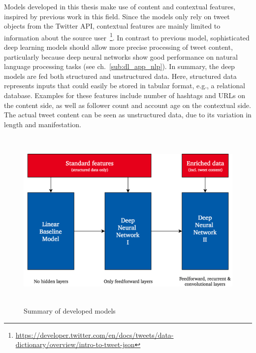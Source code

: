 Models developed in this thesis make use of content and contextual features,
inspired by previous work in this field.
Since the models only rely on tweet objects from the Twitter API, contextual
features are mainly limited to information about the source user~\footnote{\url{https://developer.twitter.com/en/docs/tweets/data-dictionary/overview/intro-to-tweet-json}}.
In contrast to previous model, sophisticated deep learning models should allow
more precise processing of tweet content, particularly because deep neural networks
show good performance on natural language processing tasks (see ch.~\ref{sub:dl_app_nlp}).
In summary, the deep models are fed both structured and unstructured data.
Here, structured data represents inputs that could easily be stored in
tabular format, e.g., a relational database.
Examples for these features include number of hashtags and URLs on the content
side, as well as follower count and account age on the contextual side.
The actual tweet content can be seen as unstructured data, due to its variation
in length and manifestation.

\begin{figure}[h]
  \includegraphics[height=9cm]{img/model_summary}
  \caption{Summary of developed models}
\label{fig:model_summary}
\end{figure}

